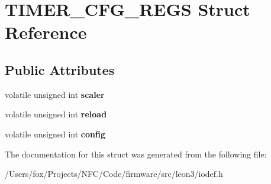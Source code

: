 \hypertarget{struct_t_i_m_e_r___c_f_g___r_e_g_s}{
\section{TIMER\_\-CFG\_\-REGS Struct Reference}
\label{struct_t_i_m_e_r___c_f_g___r_e_g_s}
}
\subsection*{Public Attributes}
\begin{DoxyCompactItemize}
\item 
\hypertarget{struct_t_i_m_e_r___c_f_g___r_e_g_s_a64865560a7679ed4fdae3ae8b900c5b7}{
volatile unsigned int {\bfseries scaler}}
\label{struct_t_i_m_e_r___c_f_g___r_e_g_s_a64865560a7679ed4fdae3ae8b900c5b7}

\item 
\hypertarget{struct_t_i_m_e_r___c_f_g___r_e_g_s_aff8d95625d87448c20f7108cf2b8eab3}{
volatile unsigned int {\bfseries reload}}
\label{struct_t_i_m_e_r___c_f_g___r_e_g_s_aff8d95625d87448c20f7108cf2b8eab3}

\item 
\hypertarget{struct_t_i_m_e_r___c_f_g___r_e_g_s_af82eecaec5b890e52025760a9047e10c}{
volatile unsigned int {\bfseries config}}
\label{struct_t_i_m_e_r___c_f_g___r_e_g_s_af82eecaec5b890e52025760a9047e10c}

\end{DoxyCompactItemize}


The documentation for this struct was generated from the following file:\begin{DoxyCompactItemize}
\item 
/Users/fox/Projects/NFC/Code/firmware/src/leon3/iodef.h\end{DoxyCompactItemize}
